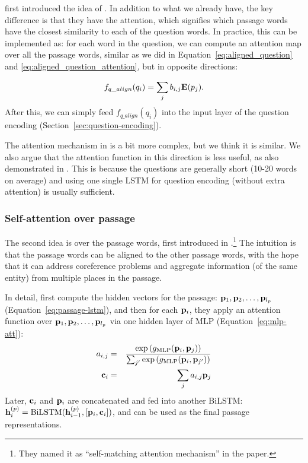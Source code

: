  first introduced the idea of . In addition to what we already have, the key difference is that they have the  attention, which signifies which passage words have the closest similarity to each of the question words. In practice, this can be implemented as: for each word in the question, we can compute an attention map over all the passage words, similar as we did in Equation~\ref{eq:aligned_question} and \ref{eq:aligned_question_attention}, but in opposite directions:

\begin{equation}
    f_{q\_align}(q_i) = \sum_j{b_{i, j} \mathbf{E}(p_j)}.
\end{equation}
After this, we can simply feed $f_{q\_align}(q_i)$ into the input layer of the question encoding (Section~\ref{sec:question-encoding}).

The attention mechanism in  is a bit more complex, but we think it is similar. We also argue that the attention function in this direction is less useful, as also demonstrated in . This is because the questions are generally short (10-20 words on average) and using one single LSTM for question encoding (without extra attention) is usually sufficient.

\subsubsection*{Self-attention over passage}
The second idea is  over the passage words, first introduced in .\footnote{They named it as ``self-matching attention mechanism'' in the paper.} The intuition is that the passage words can be aligned to the other passage words, with the hope that it can address coreference problems and aggregate information (of the same entity) from multiple places in the passage.

In detail,  first compute the hidden vectors for the passage: $\mathbf{p}_1, \mathbf{p}_2, \ldots, \mathbf{p}_{l_p}$ (Equation~\ref{eq:passage-lstm}), and then for each $\mathbf{p}_i$, they apply an attention function over $\mathbf{p}_1, \mathbf{p}_2, \ldots, \mathbf{p}_{l_p}$ via one hidden layer of MLP (Equation~\ref{eq:mlp-att}):
\begin{eqnarray}
    a_{i, j} & =&  \frac{\exp\left(g_{\text{MLP}}(\mathbf{p}_i, \mathbf{p}_j)\right)}{\sum_{j'}\exp\left(g_{\text{MLP}}(\mathbf{p}_i, \mathbf{p}_{j'})\right)} \\
    \mathbf{c}_i & = & \sum_{j}{a_{i, j}\mathbf{p}_j}
\end{eqnarray}
Later, $\mathbf{c}_i$ and $\mathbf{p}_i$ are concatenated and fed into another BiLSTM: $\mathbf{h}^{(p)}_i = \text{BiLSTM}(\mathbf{h}^{(p)}_{i-1}, [\mathbf{p}_i, \mathbf{c}_i])$, and can be used as the final passage representations.

